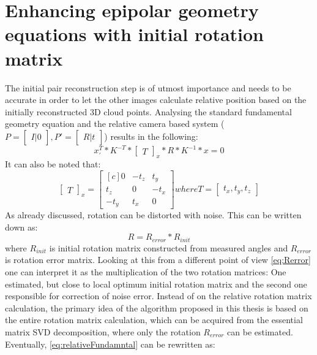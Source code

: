 \section{Enhancing epipolar geometry equations with initial rotation matrix}
The initial pair reconstruction step is of utmost importance and needs to be accurate in order to let the other images calculate relative position based on the initially reconstructed 3D cloud points.
Analysing the standard fundamental geometry equation and the relative camera based system ($P = \begin{bmatrix}I |0\end{bmatrix}, P' = \begin{bmatrix}R|t\end{bmatrix}$) results in the following:
\begin{equation} \label{eq:relativeFundamntal}
{x}_{'}^{T} * K^{-T} * \begin{bmatrix}T\end{bmatrix}_{x} * R * K^{-1} * x = 0
\end{equation}
It can also be noted that:
\begin{equation} \label{eq:skewTranslation}
\begin{bmatrix}T\end{bmatrix}_{x} = 
\begin{bmatrix*}[c]
 0 & -t_{z} & t_{y}\\
 t_{z} & 0 & -t_{x}\\
-t_{y} & t_{x} & 0 
\end{bmatrix*} 
where T = \begin{bmatrix}t_{x},t_{y},t_{z}\end{bmatrix}
\end{equation}
As already discussed, rotation can be distorted with noise. This can be written down as:
\begin{equation} \label{eq:Rerror}
R = R_{error} * R_{init} 
\end{equation}
where $R_{init}$ is initial rotation matrix constructed from measured angles and $R_{error}$ is rotation error matrix.
Looking at this from a different point of view \ref{eq:Rerror} one can interpret it as the multiplication of the two rotation matrices: 
One estimated, but close to local optimum initial rotation matrix and the second one responsible for correction of noise error. 
Instead of on the relative rotation matrix calculation, the primary idea of the algorithm proposed in this thesis is based on the entire rotation matrix calculation, which can be acquired from the essential matrix SVD decomposition, where only the rotation $R_{error}$ can be estimated. Eventually, \ref{eq:relativeFundamntal} can be rewritten as:
